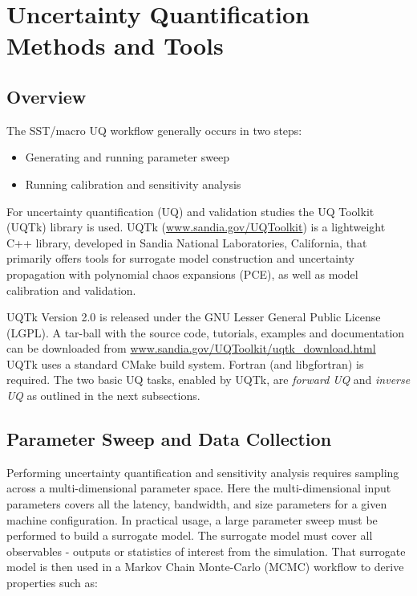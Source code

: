 
\chapter{Uncertainty Quantification Methods and Tools}
\label{chapter:uq}

\section{Overview}
\label{sec:uqoverview}
The SST/macro UQ workflow generally occurs in two steps:
\begin{itemize}
\item Generating and running parameter sweep
\item Running calibration and sensitivity analysis
\end{itemize}

For uncertainty quantification (UQ) and validation studies the UQ Toolkit (UQTk) library is used.
UQTk (\url{www.sandia.gov/UQToolkit}) is a lightweight C++ library, developed in Sandia National Laboratories, California, 
that primarily offers tools for surrogate model construction and uncertainty propagation with 
polynomial chaos expansions (PCE), as well as model calibration and validation.

UQTk Version 2.0 is released under the GNU Lesser General Public License (LGPL). 
A tar-ball with the source code, tutorials, examples and documentation can be 
downloaded from \url{www.sandia.gov/UQToolkit/uqtk\_download.html}
UQTk uses a standard CMake build system. 
Fortran (and libgfortran) is required.
The two basic UQ tasks, enabled by UQTk, are \emph{forward UQ} and \emph{inverse UQ} as outlined in the next subsections.

\section{Parameter Sweep and Data Collection}

Performing uncertainty quantification and sensitivity analysis requires sampling across a multi-dimensional parameter space.
Here the multi-dimensional input parameters covers all the latency, bandwidth, and size parameters for a given machine configuration.
In practical usage, a large parameter sweep must be performed to build a surrogate model.
The surrogate model must cover all observables - outputs or statistics of interest from the simulation.
That surrogate model is then used in a Markov Chain Monte-Carlo (MCMC) workflow to derive properties such as:

